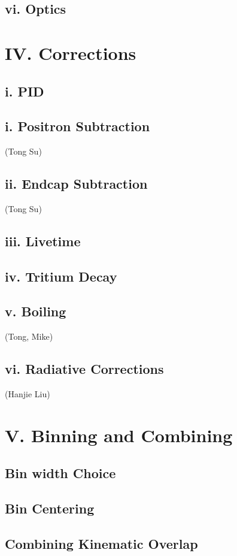 \documentclass[letterpaper,aps,prl,superscriptaddress,floatfix,twocolumn]{revtex4}
\begin{document}
 \subsection{vi. Optics}

\section{IV. Corrections}

 \subsection{i. PID}

 \subsection{i. Positron Subtraction}
 (Tong Su)

 \subsection{ii. Endcap Subtraction}
 (Tong Su)

 \subsection{iii. Livetime}

 \subsection{iv. Tritium Decay}
 

 \subsection{v. Boiling}
 (Tong, Mike)

 \subsection{vi. Radiative Corrections}
 (Hanjie Liu)

\section{V. Binning and Combining}

 \subsection{Bin width Choice}

 \subsection{Bin Centering}

 \subsection{Combining Kinematic Overlap}
\end{document}
